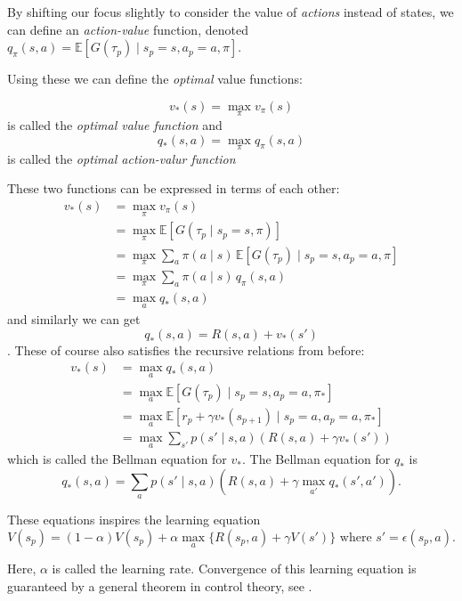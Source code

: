 \documentclass{article}
\theoremstyle{changedot}
\theoremstyle{changedotbreak}
\theoremstyle{nonumberplain}
\newcommand{\m}{\mathbb}
\begin{document}
By shifting our focus slightly to consider the value of \emph{actions} instead of states, we can define an \emph{action-value} function, denoted $q_{\pi}(s, a) = \m E[G(\tau_{p}) \mid s_{p} = s, a_{p} = a, \pi]$.

Using these we can define the \emph{optimal} value functions:

\begin{definition}
  \[v_{*}(s) = \max_{\pi} v_{\pi}(s)\] is called the \emph{optimal value function} and \[q_{*}(s, a) = \max_{\pi} q_{\pi}(s, a)\] is called the \emph{optimal action-valur function}
\end{definition}

These two functions can be expressed in terms of each other:
\begin{align*}
  v_{*}(s) &= \max_{\pi} v_{\pi}(s) \\
           &= \max_{\pi} \m E[G(\tau_{p} \mid s_{p} = s, \pi)] \\
           &= \max_{\pi} \sum_{a} \pi(a \mid s) \, \m E[G(\tau_{p}) \mid s_{p} = s, a_{p} = a, \pi] \\
           &= \max_{\pi} \sum_{a} \pi(a \mid s) \, q_{\pi} (s, a) \\
  &= \max_{a} q_{*}(s, a)
\end{align*}
and similarly we can get \[q_{*}(s, a) = R(s, a) + v_{*}(s')\]. These of course also satisfies the recursive relations from before:
\begin{align*}
  v_{*}(s) &= \max_{a} q_{*}(s, a) \\
           &= \max_{a} \m E[G(\tau_{p}) \mid s_{p} = s, a_{p} = a, \pi_{*}] \\
           &= \max_{a} \m E[r_{p} + \gamma v_{*}(s_{p+1}) \mid s_{p} = a, a_{p} = a, \pi_{*}] \\
           &= \max_{a} \sum_{s'} p(s' \mid s, a) (R(s, a) + \gamma v_{*}(s') )
\end{align*}
which is called the Bellman equation for $v_{*}$. The Bellman equation for $q_{*}$ is
\[q_{*}(s, a) = \sum_{a} p(s' \mid s, a) (R(s, a) + \gamma \max_{a'} q_{*}(s', a')).\]

These equations inspires the learning equation
\[V(s_{p}) = (1 - \alpha) V(s_{p}) + \alpha \max_{a} \{R(s_{p}, a) + \gamma V(s')\} \text{ where $s'= \epsilon(s_{p}, a)$}.\]

Here, $\alpha$ is called the learning rate. Convergence of this learning equation is guaranteed by a general theorem in control theory, see \cite{cjch}.
\end{document}
